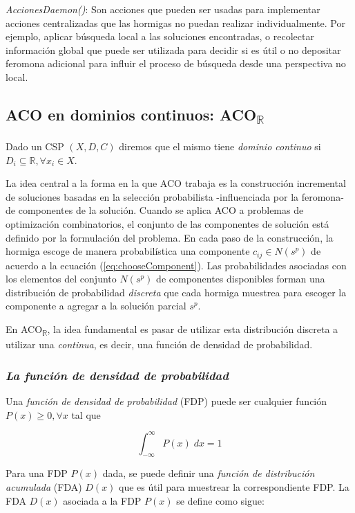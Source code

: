 \documentclass{llncs}
\begin{document}
	\textit{AccionesDaemon()}: Son acciones que pueden ser usadas para implementar acciones centralizadas 
	que las hormigas no puedan realizar individualmente. Por ejemplo, aplicar búsqueda local a las soluciones encontradas, 
	o recolectar información global que puede ser utilizada para decidir si es útil o no depositar feromona adicional para 
	influir el proceso de búsqueda desde una perspectiva no local.

	\subsection{ACO en dominios continuos: ACO\textsubscript{$\mathbb{R}$}}
	\label{subsec:acor}
	Dado un CSP $(X,D,C)$ diremos que el mismo tiene \textit{dominio continuo} si $D_i \subseteq \mathbb{R}, \forall x_i \in X$.
	
	La idea central a la forma en la que ACO trabaja es la construcción incremental de soluciones basadas 
	en la selección probabilista -influenciada por la feromona- de componentes de la solución. Cuando se aplica ACO 
	a problemas de optimización combinatorios, el conjunto de las componentes de solución está definido 
	por la formulación del problema. En cada paso de la construcción, la hormiga escoge de manera probabilística 
	una componente $c_{ij} \in N(s^p)$ de acuerdo a la ecuación (\ref{eq:chooseComponent}). Las probabilidades 
	asociadas con los elementos del conjunto $N(s^p)$ de componentes disponibles  forman una distribución 
	de probabilidad \textit{discreta} que cada hormiga muestrea para escoger la componente a agregar 
	a la solución parcial $s^p$.
	
	En ACO\textsubscript{$\mathbb{R}$}, la idea fundamental es pasar de utilizar esta distribución discreta a utilizar una \textit{continua}, es decir, una función de densidad de probabilidad.
	
	\subsubsection{\textit{La función de densidad de probabilidad}}
	Una \textit{función de densidad de probabilidad} (FDP) puede ser cualquier función $P(x) \geq 0, \forall x$ tal que
	
	\begin{equation*}
	\int_{-\infty}^{\infty}P(x)\;dx = 1
	\end{equation*}
	
	Para una FDP $P(x)$ dada, se puede definir una \textit{función de distribución acumulada} (FDA) $D(x)$ que es útil para muestrear la correspondiente FDP. La FDA $D(x)$ asociada a la FDP $P(x)$ se define como sigue:
	
\end{document}
